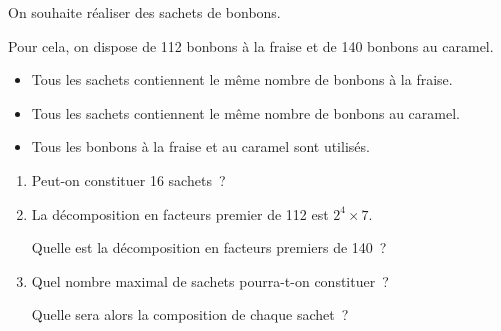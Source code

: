 \documentclass[exercice]{thedocument}%
\begin{document}
%
    On souhaite réaliser des sachets de bonbons.\par\medskip\noindent
    Pour cela, on dispose de 112 bonbons à la fraise et de 140
    bonbons au caramel.
    \begin{itemize}
        \item Tous les sachets contiennent le même nombre
        de bonbons à la fraise.
        \item Tous les sachets contiennent le même nombre
        de bonbons au caramel.
        \item Tous les bonbons à la fraise et au caramel
        sont utilisés.
    \end{itemize} 
    \begin{enumerate}
        \item Peut-on constituer 16 sachets~?
        \item La décomposition en facteurs premier de 112
        est $2^4\times7$.\medskip\par\noindent Quelle est
        la décomposition en facteurs premiers de 140~?
        \item Quel nombre maximal de sachets pourra-t-on
        constituer~?\medskip\par\noindent
        Quelle sera alors la composition de chaque sachet~?
    \end{enumerate}
    \showthesource
\end{document}
